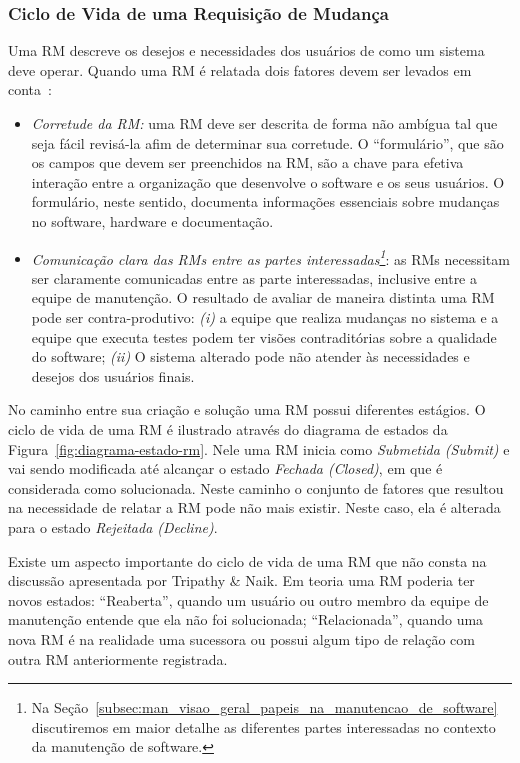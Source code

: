 \subsubsection{Ciclo de Vida de uma Requisição de Mudança}
\label{sub:fluxo_de_trabalho_requisicao_mudanca}

Uma RM descreve os desejos e necessidades dos usuários de como um sistema deve
operar. Quando uma RM é relatada dois fatores devem ser levados em
conta~\cite{tripathy2014software}:

\begin{itemize}
	\item \textit{Corretude da RM:} uma RM deve ser descrita de forma não
		ambígua tal que seja fácil revisá-la afim de determinar sua corretude. O
		``formulário'', que são os campos que devem ser preenchidos na RM, são a
		chave para efetiva interação entre a organização que desenvolve o
		software e os seus usuários. O formulário, neste sentido, documenta
		informações essenciais sobre mudanças no software, hardware e
		documentação.
   \item \textit{Comunicação clara das RMs entre as partes
           interessadas\footnote{Na
               Seção~\ref{subsec:man_visao_geral_papeis_na_manutencao_de_software}
               discutiremos em maior detalhe as diferentes partes interessadas
               no contexto da manutenção de software.}}: as RMs necessitam ser
       claramente comunicadas entre as parte interessadas, inclusive entre a
       equipe de manutenção. O resultado de avaliar de maneira distinta uma RM
       pode ser contra-produtivo: \textit{(i)} a equipe que realiza mudanças no
       sistema e a equipe que executa testes podem ter visões contraditórias
       sobre a qualidade do software; \textit{(ii)} O sistema alterado pode não
       atender às necessidades e desejos dos usuários finais.
\end{itemize}

No caminho entre sua criação e solução uma RM possui diferentes estágios. O
ciclo de vida de uma RM é ilustrado através do diagrama de estados da
Figura~\ref{fig:diagrama-estado-rm}. Nele uma RM inicia como \textit{Submetida
    (Submit)} e vai sendo modificada até alcançar o estado \textit{Fechada
    (Closed)}, em que é considerada como solucionada. Neste caminho o conjunto
de fatores que resultou na necessidade de relatar a RM pode não mais existir.
Neste caso, ela é alterada para o estado \textit{Rejeitada (Decline)}.

Existe um aspecto importante do ciclo de vida de uma RM que não consta na
discussão apresentada por Tripathy \& Naik. Em teoria uma RM poderia ter novos
estados: ``Reaberta'', quando um usuário ou outro membro da equipe de manutenção
entende que ela não foi solucionada; ``Relacionada'', quando uma nova RM é na
realidade uma sucessora ou possui algum tipo de relação com outra RM
anteriormente registrada.

